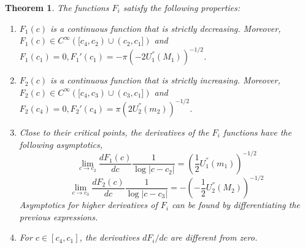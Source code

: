 \documentclass[12pt]{amsart}
\numberwithin{equation}{subsection}
\theoremstyle{definition}
\theoremstyle{plain}
\newtheorem{theorem}[equation]{Theorem}
\begin{document}
\begin{theorem}
The functions $F_i$ satisfy the following properties:
\begin{enumerate}
\label{asympt1}
\item $F_1(c)$ is a continuous function that is strictly decreasing. Moreover, \linebreak $F_1(c) \in C^{\infty}([c_4,c_2) \cup (c_2, c_1])$
and $F_1(c_1) = 0, {F_1}'(c_1) = -\pi (-2U_{1}^{''}(M_1))^{-1/2}$.
\item $F_2(c)$ is a continuous function that is strictly increasing. Moreover, \linebreak $F_2(c) \in C^{\infty}([c_4,c_3) \cup (c_3, c_1])$
and $F_2(c_4) = 0, {F_2}'(c_4) = \pi (2U_{2}^{''}(m_2))^{-1/2}$.
\item Close to their critical points, the derivatives of the $F_i$ functions have the following asymptotics,
\[
\lim_{c \rightarrow c_{2}} \frac{dF_1(c)}{dc} \frac{1}{\log|c-c_{2}|} = (\frac{1}{2}U_{1}^{''}(m_1))^{-1/2}
\]
\[
\lim_{c \rightarrow c_{3}} \frac{dF_2(c)}{dc} \frac{1}{\log|c-c_{3}|} = -(-\frac{1}{2}U_{2}^{''}(M_2))^{-1/2}
\]
Asymptotics for higher derivatives of $F_i$ can be found by differentiating the previous expressions.
\item For $c \in [c_4,c_1]$, the derivatives $dF_i/dc$ are different from zero.
\end{enumerate}
\end{theorem}
\end{document}
